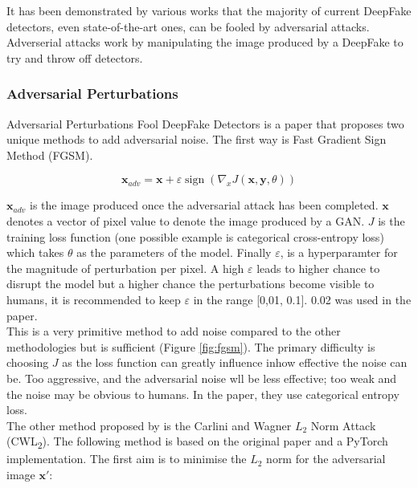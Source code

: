 \documentclass{article}
\begin{document}
It has been demonstrated by various works that the majority of current DeepFake detectors, even state-of-the-art ones, can be fooled by adversarial attacks\cite{juefei2022countering}. Adverserial attacks work by manipulating the image produced by a DeepFake to try and throw off detectors.

\subsubsection{Adversarial Perturbations}

Adversarial Perturbations Fool DeepFake Detectors\cite{pertubations} is a paper that proposes two unique methods to add adversarial noise. The first way is Fast Gradient Sign Method (FGSM).

\begin{equation}
    \mathbf{x}_{adv} = \mathbf{x} + \varepsilon \operatorname{sign} (\nabla _x J( \mathbf{x},\mathbf{y}, \theta ))
\end{equation}

$\mathbf{x}_{adv}$ is the image produced once the adversarial attack has been completed. $\mathbf{x}$ denotes a vector of pixel value to denote the image produced by a GAN. $J$ is the training loss function (one possible example is categorical cross-entropy loss) which takes $\theta$ as the parameters of the model. Finally $\varepsilon$, is a hyperparamter for the magnitude of perturbation per pixel. A high $\varepsilon$ leads to higher chance to disrupt the model but a higher chance the perturbations become visible to humans, it is recommended to keep $\varepsilon$ in the range [0,01, 0.1]. 0.02 was used in the paper\cite{pertubations}.\\

This is a very primitive method to add noise compared to the other methodologies but is sufficient (Figure \ref{fig:fgsm}). The primary difficulty is choosing $J$ as the loss function can greatly influence inhow effective the noise can be. Too aggressive, and the adversarial noise wll be less effective; too weak and the noise may be obvious to humans. In the paper, they use categorical entropy loss.\\

The other method proposed by \cite{pertubations} is the Carlini and Wagner $L_2$ Norm Attack (CWL\textsubscript{2}). The following method is based on the original paper\cite{carlini2017towards} and a PyTorch implementation\cite{cwl2python}. The first aim is to minimise the $L_2$ norm for the adversarial image $\mathbf{x}'$:
\end{document}
